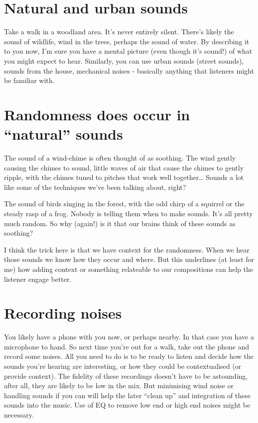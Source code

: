 \documentclass[
  12pt,
  letterpaper,
  oneside,
  open=any]{scrbook}
\begin{document}
\section{Natural and urban sounds}\label{natural-and-urban-sounds}

Take a walk in a woodland area. It's never entirely silent. There's
likely the sound of wildlife, wind in the trees, perhaps the sound of
water. By describing it to you now, I'm sure you have a mental picture
(even though it's sound!) of what you might expect to hear. Similarly,
you can use urban sounds (street sounds), sounds from the house,
mechanical noises - basically anything that listeners might be familiar
with.

\section{Randomness does occur in ``natural''
sounds}\label{randomness-does-occur-in-natural-sounds}

The sound of a wind-chime is often thought of as soothing. The wind
gently causing the chimes to sound, little waves of air that cause the
chimes to gently ripple, with the chimes tuned to pitches that work well
together\ldots{} Sounds a lot like some of the techniques we've been
talking about, right?

The sound of birds singing in the forest, with the odd chirp of a
squirrel or the steady rasp of a frog. Nobody is telling them when to
make sounds. It's all pretty much random. So why (again!) is it that our
brains think of these sounds as soothing?

I think the trick here is that we have context for the randomness. When
we hear those sounds we know how they occur and where. But this
underlines (at least for me) how adding context or something relateable
to our compositions can help the listener engage better.

\section{Recording noises}\label{recording-noises}

You likely have a phone with you now, or perhaps nearby. In that case
you have a microphone to hand. So next time you're out for a walk, take
out the phone and record some noises. All you need to do is to be ready
to listen and decide how the sounds you're hearing are interesting, or
how they could be contextualised (or provide context). The fidelity of
these recordings doesn't have to be astounding, after all, they are
likely to be low in the mix. But minimising wind noise or handling
sounds if you can will help the later ``clean up'' and integration of
these sounds into the music. Use of EQ to remove low end or high end
noises might be necessary.
\end{document}
